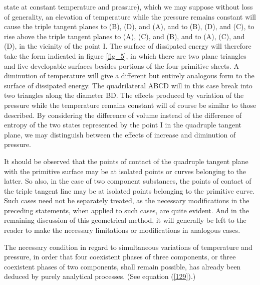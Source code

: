 \documentclass[12pt]{article}
\begin{document}
state at constant temperature and pressure), which we may suppose without loss of generality, an elevation of temperature while the pressure remains constant will cause the triple tangent planes to (B), (D), and (A), and to (B), (D), and (C), to rise above the triple tangent planes to (A), (C), and (B), and to (A), (C), and (D), in the vicinity of the point I.  The surface of dissipated energy will therefore take the form indicated in figure \ref{fig_5}, in which there are two plane triangles and five developable surfaces besides portions of the four primitive sheets. A diminution of temperature will give a different but entirely analogous form to the surface of dissipated energy. The quadrilateral ABCD will in this case break into two triangles along the diameter BD. The effects produced by variation of the pressure while the temperature remains constant will of course be similar to those described. By considering the difference of volume instead of the difference of entropy of the two states represented by the point I in the quadruple tangent plane, we may distinguish between the effects of increase and diminution of pressure. 


It should be observed that the points of contact of the quadruple tangent plane with the primitive surface may be at isolated points or curves belonging to the latter. So also, in the case of two component substances, the points of contact of the triple tangent line may be at isolated points belonging to the primitive curve. Such cases need not be separately treated, as the necessary modifications in the preceding statements, when applied to such cases, are quite evident. And in the remaining discussion of this geometrical method, it will generally be left to the reader to make the necessary limitations or modifications in analogous cases.


The necessary condition in regard to simultaneous variations of temperature and pressure, in order that four coexistent phases of three components, or three coexistent phases of two components, shall remain possible, has already been deduced by purely analytical processes. (See equation (\ref{129}).)
\end{document}
